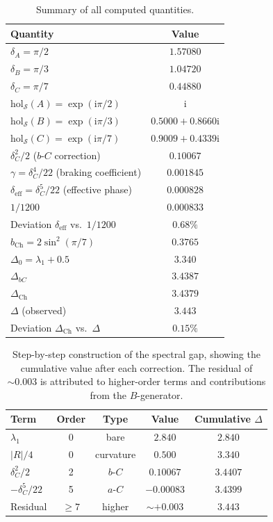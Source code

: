 \documentclass[12pt,a4paper]{article}
\theoremstyle{definition}
\theoremstyle{remark}
\newcommand{\hol}{\mathrm{hol}}
\newcommand{\cS}{\mathcal{S}}
\newcommand{\ii}{\mathrm{i}}
\begin{document}
\begin{table}[H]
\centering
\begin{tabular}{lc}
\toprule
\textbf{Quantity} & \textbf{Value} \\
\midrule
$\delta_A = \pi/2$ & $1.57080$ \\
$\delta_B = \pi/3$ & $1.04720$ \\
$\delta_C = \pi/7$ & $0.44880$ \\
$\hol_{\cS}(A) = \exp(\ii\pi/2)$ & $\ii$ \\
$\hol_{\cS}(B) = \exp(\ii\pi/3)$ & $0.5000 + 0.8660\ii$ \\
$\hol_{\cS}(C) = \exp(\ii\pi/7)$ & $0.9009 + 0.4339\ii$ \\
\midrule
$\delta_C^2/2$ ($b$-$C$ correction) & $0.10067$ \\
$\gamma = \delta_C^4/22$ (braking coefficient) & $0.001845$ \\
$\delta_{\mathrm{eff}} = \delta_C^5/22$ (effective phase) & $0.000828$ \\
$1/1200$ & $0.000833$ \\
Deviation $\delta_{\mathrm{eff}}$ vs.\ $1/1200$ & $0.68\%$ \\
\midrule
$b_{\mathrm{Ch}} = 2\sin^2(\pi/7)$ & $0.3765$ \\
\midrule
$\Delta_0 = \lambda_1 + 0.5$ & $3.340$ \\
$\Delta_{bC}$ & $3.4387$ \\
$\Delta_{\mathrm{Ch}}$ & $3.4379$ \\
$\Delta$ (observed) & $3.443$ \\
Deviation $\Delta_{\mathrm{Ch}}$ vs.\ $\Delta$ & $0.15\%$ \\
\bottomrule
\end{tabular}
\caption{Summary of all computed quantities.}
\label{tab:summary}
\end{table}

\begin{table}[H]
\centering
\begin{tabular}{lcccc}
\toprule
\textbf{Term} & \textbf{Order} & \textbf{Type} & \textbf{Value} & \textbf{Cumulative $\Delta$} \\
\midrule
$\lambda_1$ & 0 & bare & $2.840$ & $2.840$ \\
$|R|/4$ & 0 & curvature & $0.500$ & $3.340$ \\
$\delta_C^2/2$ & 2 & $b$-$C$ & $0.10067$ & $3.4407$ \\
$-\delta_C^5/22$ & 5 & $a$-$C$ & $-0.00083$ & $3.4399$ \\
\midrule
Residual & $\geq 7$ & higher & $\sim +0.003$ & $3.443$ \\
\bottomrule
\end{tabular}
\caption{Step-by-step construction of the spectral gap, showing the cumulative value after each correction. The residual of $\sim 0.003$ is attributed to higher-order terms and contributions from the $B$-generator.}
\label{tab:step_by_step}
\end{table}
\end{document}
